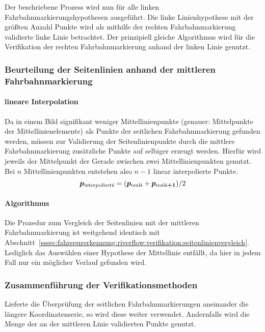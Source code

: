 Der beschriebene Prozess wird nun für alle linken Fahrbahnmarkierungshypothesen ausgeführt. Die linke Linienhypothese mit der größten Anzahl Punkte wird als mithilfe der rechten Fahrbahnmarkierung validierte linke Linie betrachtet. Der prinzipiell gleiche Algorithmus wird für die Verifikation der rechten Fahrbahnmarkierung anhand der linken Linie genutzt.

\subsubsection{Beurteilung der Seitenlinien anhand der mittleren Fahrbahnmarkierung}
\paragraph{lineare Interpolation}
Da in einem Bild signifikant weniger Mittellinienpunkte (genauer: Mittelpunkte der Mittellinienelemente) als Punkte der seitlichen Fahrbahnmarkierung gefunden werden, müssen zur Validierung der Seitenlinienpunkte durch die mittlere Fahrbahnmarkierung zusätzliche Punkte auf selbiger erzeugt werden. Hierfür wird jeweils der Mittelpunkt der Gerade zwischen zwei Mittellinienpunkten genutzt. Bei \( n \) Mittellinienpunkten entstehen also \( n-1 \) linear interpolierte Punkte.
\begin{equation}
\boldsymbol{p_{\text{interpoliert}i}} = (\boldsymbol{p_{\text{real}i}}+\boldsymbol{p_{\text{real}i+1}})/2 
\end{equation}
\paragraph{Algorithmus} Die Prozedur zum Vergleich der Seitenlinien mit der mittleren Fahrbahnmarkierung ist weitgehend identisch mit Abschnitt~\ref{sssec:fahrspurerkennung:riverflow:verifikation:seitenlinienvergleich}. Lediglich das Auswählen einer Hypothese der Mittellinie entfällt, da hier in jedem Fall nur ein möglicher Verlauf gefunden wird.

\subsubsection{Zusammenführung der Verifikationsmethoden}
Lieferte die Überprüfung der seitlichen Fahrbahnmarkierungen aneinander die längere Koordinatenserie, so wird diese weiter verwendet. Andernfalls wird die Menge der an der mittleren Linie validierten Punkte genutzt.
